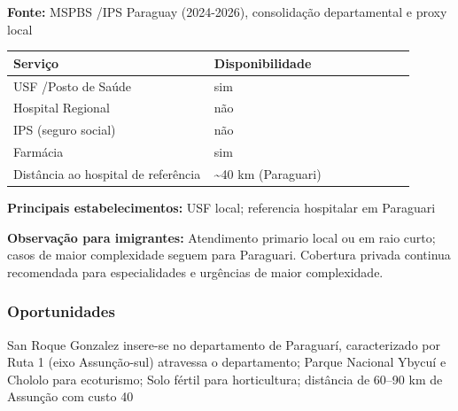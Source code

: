 \textbf{Fonte:} MSPBS /\allowbreak  IPS Paraguay (2024-2026), consolidação
departamental e proxy local

{\def\LTcaptype{none} %
\begin{longtable}{@{}>{\raggedright\arraybackslash}p{0.45\linewidth} >{\raggedright\arraybackslash}p{0.45\linewidth}@{}}
\toprule\noalign{}
Serviço & Disponibilidade \\
\midrule\noalign{}
\endhead
\bottomrule\noalign{}
\endlastfoot
USF /\allowbreak  Posto de Saúde & sim \\
Hospital Regional & não \\
IPS (seguro social) & não \\
Farmácia & sim \\
Distância ao hospital de referência & \textasciitilde40 km
(Paraguari) \\
\end{longtable}
}

\textbf{Principais estabelecimentos:} USF local; referencia hospitalar
em Paraguari

\textbf{Observação para imigrantes:} Atendimento primario local ou em
raio curto; casos de maior complexidade seguem para Paraguari. Cobertura
privada continua recomendada para especialidades e urgências de maior
complexidade.
\newpage

\subsubsection*{Oportunidades}\label{oport-san-roque-gonzalez-0915}
San Roque Gonzalez insere-se no departamento de Paraguarí, caracterizado por Ruta 1 (eixo Assunção-sul) atravessa o departamento; Parque Nacional Ybycuí e Chololo para ecoturismo; Solo fértil para horticultura; distância de 60–90 km de Assunção com custo 40%

